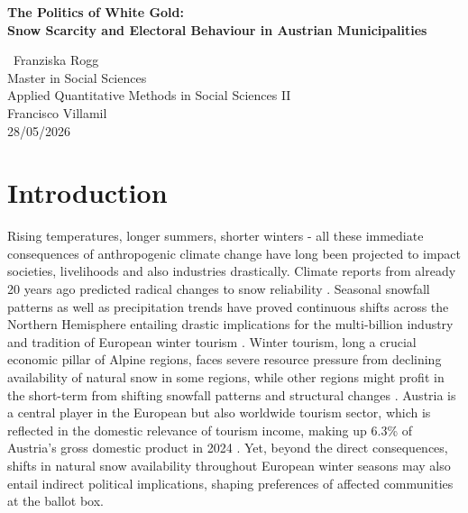 \documentclass{article}
\begin{document}
\begin{titlepage}
  \centering
  \vspace*{3cm}

  {\large\bfseries The Politics of White Gold:\\ 
  Snow Scarcity and Electoral Behaviour in Austrian Municipalities}

  \vspace{4cm}

  {\normalsize\ Franziska Rogg}\\
  {\normalsize Master in Social Sciences}\\
  {\normalsize Applied Quantitative Methods in Social Sciences II}\\
  {\normalsize Francisco Villamil}\\
  {\normalsize 28/05/2026}

\end{titlepage}

\section{Introduction}
Rising temperatures, longer summers, shorter winters - all these immediate consequences of anthropogenic climate change have long been projected to impact societies, livelihoods and also industries drastically. Climate reports from already 20 years ago predicted radical changes to snow reliability \parencite{oecd2007}. Seasonal snowfall patterns as well as precipitation trends have proved continuous shifts across the Northern Hemisphere \parencite{li2025, Olefs2020} entailing drastic implications for the multi-billion industry and tradition of European winter tourism \parencite{lealfilho2024}. Winter tourism, long a crucial economic pillar of Alpine regions, faces severe resource pressure from declining availability of natural snow in some regions, while other regions might profit in the short-term from shifting snowfall patterns and structural changes \parencite{oecd2007, lealfilho2024}. Austria is a central player in the European but also worldwide tourism sector, which is reflected in the domestic relevance of tourism income, making up 6.3\% of Austria's gross domestic product in 2024 \parencite{fritz2025}. 
Yet, beyond the direct consequences, shifts in natural snow availability throughout European winter seasons may also entail indirect political implications, shaping preferences of affected communities at the ballot box. 
\end{document}
